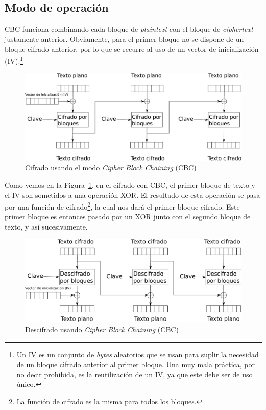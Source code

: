 \subsection{Modo de operación}

CBC funciona combinando cada bloque de \emph{plaintext} con el bloque de \emph{ciphertext} justamente anterior. Obviamente, para el primer bloque no se dispone de un bloque cifrado anterior, por lo que se recurre al uso de un vector de inicialización (IV).\footnote{Un IV es un conjunto de \emph{bytes} aleatorios que se usan para suplir la necesidad de un bloque cifrado anterior al primer bloque. Una muy mala práctica, por no decir prohibida, es la reutilización de un IV, ya que este debe ser de uso único.}

\begin{figure}[ht]
  \centering
  \includegraphics[scale=0.5]{Figures/CBC_enc}
  \decoRule
  \caption[\emph{Cipher Block Chaining} (CBC) - Cifrado]{Cifrado usando el modo \emph{Cipher Block Chaining} (CBC)}
  \label{fig:CBC_enc}
\end{figure}

Como vemos en la Figura~\ref{fig:CBC_enc}, en el cifrado con CBC, el primer bloque de texto y el IV son sometidos a una operación XOR. El resultado de esta operación se pasa por una función de cifrado\footnote{La función de cifrado es la misma para todos los bloques.}, la cual nos dará el primer bloque cifrado. Este primer bloque es entonces pasado por un XOR junto con el segundo bloque de texto, y así sucesivamente.

\begin{figure}[ht]
  \centering
  \includegraphics[scale=0.5]{Figures/CBC_dec}
  \decoRule
  \caption[\emph{Cipher Block Chaining} (CBC) - Descifrado]{Descifrado usando \emph{Cipher Block Chaining} (CBC)}
  \label{fig:CBC_dec}
\end{figure}

